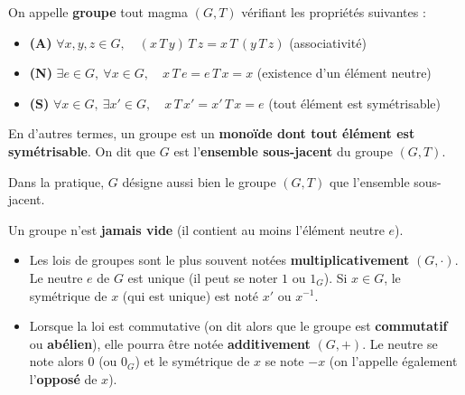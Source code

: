 \documentclass[a4paper,11pt]{article}
\newcommand{\mot}[1]{\textcolor{bordeaux}{\textbf{#1}}}
\begin{document}
\begin{definition}
On appelle \mot{groupe} tout magma $(G, T)$ vérifiant les propriétés suivantes :
\begin{itemize}
    \item \textbf{(A)} $\forall x, y, z \in G, \quad (x \, T \, y) \, T \, z = x \, T \, (y \, T \, z)$ \quad (associativité)
    \item \textbf{(N)} $\exists e \in G, \ \forall x \in G, \quad x \, T \, e = e \, T \, x = x$ \quad (existence d'un élément neutre)
    \item \textbf{(S)} $\forall x \in G, \ \exists x' \in G, \quad x \, T \, x' = x' \, T \, x = e$ \quad (tout élément est symétrisable)
\end{itemize}
En d'autres termes, un groupe est un \mot{monoïde dont tout élément est symétrisable}.
On dit que $G$ est l'\mot{ensemble sous-jacent} du groupe $(G, T)$.
\end{definition}

Dans la pratique, $G$ désigne aussi bien le groupe $(G, T)$ que l'ensemble sous-jacent.

\begin{remarque}
Un groupe n'est \mot{jamais vide} (il contient au moins l'élément neutre $e$).
\end{remarque}

\begin{remarque}[Notations]
\begin{itemize}
    \item Les lois de groupes sont le plus souvent notées \mot{multiplicativement} $(G, \cdot)$. Le neutre $e$ de $G$ est unique (il peut se noter $1$ ou $1_G$). Si $x \in G$, le symétrique de $x$ (qui est unique) est noté $x'$ ou $x^{-1}$.
    \item Lorsque la loi est commutative (on dit alors que le groupe est \mot{commutatif} ou \mot{abélien}), elle pourra être notée \mot{additivement} $(G, +)$. Le neutre se note alors $0$ (ou $0_G$) et le symétrique de $x$ se note $-x$ (on l'appelle également l'\mot{opposé} de $x$).
\end{itemize}
\end{remarque}
\end{document}
